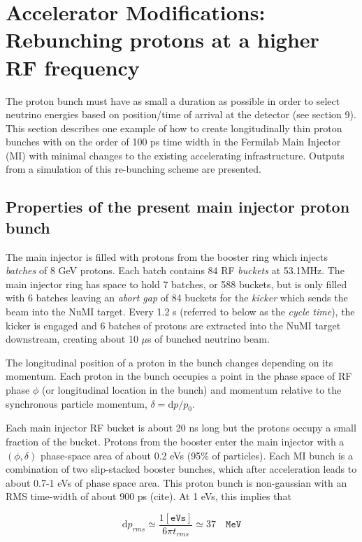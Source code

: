 
\section{Accelerator Modifications: Rebunching protons at a higher RF frequency}
\label{RF}

The proton bunch must have as small a duration as possible in order to
select neutrino energies based on position/time of arrival at the
detector (see section 9). This section describes one example of how to
create longitudinally thin proton bunches with on the order of 100 ps
time width in the Fermilab Main Injector (MI) with minimal changes to
the existing accelerating infrastructure. Outputs from a simulation of
this re-bunching scheme are presented.


\subsection{Properties of the present main injector proton bunch}
The main injector is filled with protons from the booster ring which
injects \textit{batches} of 8 GeV protons. Each batch contains 84 RF
\textit{buckets} at 53.1MHz. The main injector ring has space to hold
7 batches, or 588 buckets, but is only filled with 6 batches leaving an 
\textit{abort gap} of 84 buckets for the \textit{kicker} which sends the
 beam into the NuMI target. Every 1.2 s (referred to below as the \textit{cycle
  time}), the kicker is engaged and 6 batches of protons are extracted
into the NuMI target downstream, creating about 10 $\mu$s of bunched
neutrino beam.

The longitudinal position of a proton in the bunch changes depending
on its momentum. Each proton in the bunch occupies a point in the
phase space of RF phase $\phi$ (or longitudinal location in the bunch)
and momentum relative to the synchronous particle momentum, $\delta =
\mathrm{d}p/p_0$.

Each main injector RF bucket is about 20 ns long but the protons occupy a small 
fraction of the bucket. Protons from the booster enter the main injector with a
$(\phi, \delta)$ phase-space area of about 0.2 eVs (95\% of particles). Each MI bunch
is a combination of two slip-stacked booster bunches, which after acceleration leads to
about 0.7-1 eVs of phase space area. This proton bunch is
non-gaussian with an RMS time-width of about 900 ps (cite). At 1 eVs, this implies that 

\begin{equation}
\mathrm{d}p_{rms} \simeq \frac{1 [\texttt{eVs}]}{6\pi t_{rms}}  \simeq 37 \quad \texttt{MeV}
\end{equation}

